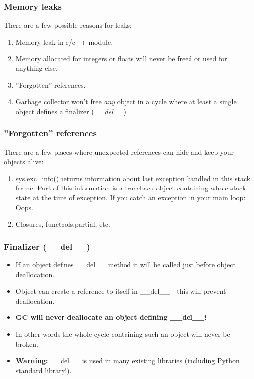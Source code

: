 \documentclass{beamer}
\begin{document}
\frame\subsectionpage
    \begin{frame}
        \frametitle{Memory leaks}
        There are a few possible reasons for leaks:
        \begin{enumerate}
            \item Memory leak in c/c++ module.
            \item Memory allocated for integers or floats will never be freed or used for anything else.
            \item ''Forgotten'' references.
            \item Garbage collector won't free \textit{any} object in a cycle where at least a single object defines a finalizer (\textit{\_\_del\_\_}).
        \end{enumerate}
    \end{frame}

    \begin{frame}
        \frametitle{''Forgotten'' references}
        There are a few places where unexpected references can hide and keep your objects alive:
        \begin{enumerate}
            \item sys.exc\_info() returns information about last exception handled in this stack frame. Part of this information is a traceback object containing whole stack state at the time of exception. If you catch an exception in your main loop: Oops.
            \item Closures, functools.partial, etc.
        \end{enumerate}
    \end{frame}

    \begin{frame}
        \frametitle{Finalizer (\_\_del\_\_)}
        \begin{itemize}
            \item If an object defines \_\_del\_\_ method it will be called just before object deallocation.
            \item Object can create a reference to itself in \_\_del\_\_ - this will prevent deallocation.
            \item \textbf{GC will never deallocate an object defining \_\_del\_\_!}
            \item In other words the whole cycle containing such an object will never be broken.
            \item \textbf{Warning:} \_\_del\_\_ is used in many existing libraries (including Python standard library!).
        \end{itemize}
    \end{frame}
\end{document}
